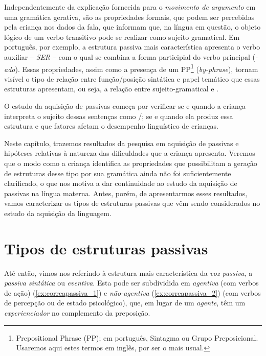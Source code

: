 \documentclass[output=paper]{LSP/langsci}
\begin{document}
Independentemente da explicação fornecida para o \textit{movimento de argumento} em uma gramática gerativa, são as propriedades formais, que podem ser percebidas pela criança nos dados da fala, que informam que, na língua em questão, o objeto lógico de um verbo transitivo pode se realizar como sujeito gramatical. Em português, por exemplo, a estrutura passiva mais característica apresenta o verbo auxiliar – \textit{SER} – com o qual se combina a forma participial do verbo principal (\textit{-ado}). Essas propriedades, assim como a presença de um PP\footnote{Prepositional Phrase (PP); em português, Sintagma ou Grupo Preposicional. Usaremos aqui estes termos em inglês, por ser o mais usual.} (\textit{by-phrase}), tornam visível o tipo de relação entre função/posição sintática e papel temático que essas estruturas apresentam, ou seja, a relação entre sujeito-gramatical e .

O estudo da aquisição de passivas começa por verificar se e quando a criança interpreta o sujeito dessas sentenças como /; se e quando ela produz essa estrutura e que fatores afetam o desempenho linguístico de crianças.\largerpage 

Neste capítulo, trazemos resultados da pesquisa em aquisição de passivas e hipóteses relativas à natureza das dificuldades que a criança apresenta. Veremos que o modo como a criança identifica as propriedades que possibilitam a geração de estruturas desse tipo por sua gramática ainda não foi suficientemente clarificado, o que nos motiva a dar continuidade ao estudo da aquisição de passivas na língua materna. Antes, porém, de apresentarmos esses resultados, vamos caracterizar os tipos de estruturas passivas que vêm sendo considerados no estudo da aquisição da linguagem.  

\section{Tipos de estruturas passivas}
\label{sec:correapassiva_tipos_passivas}
Até então, vimos nos referindo à estrutura mais característica da \textit{voz passiva}, a \textit{passiva sintática} ou \textit{eventiva}. Esta pode ser subdividida em \textit{agentiva} (com verbos de ação) (\ref{ex:correapassiva_1}) e \textit{não-agentiva} (\ref{ex:correapassiva_2}) (com verbos de percepção ou de estado psicológico), que, em lugar de um \textit{agente}, têm um \textit{experienciador} no complemento da preposição. 
\end{document}
